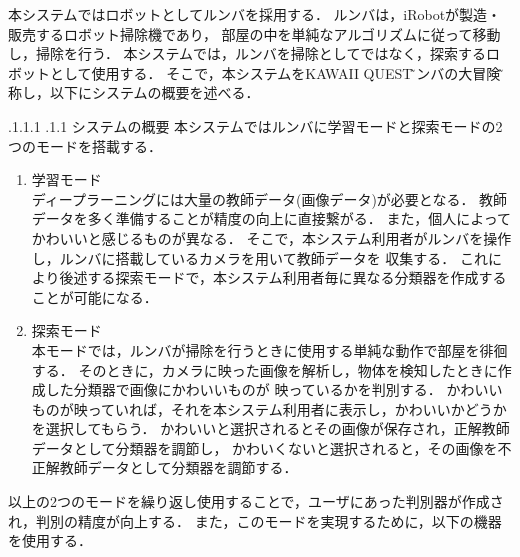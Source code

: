 \documentclass[a4paper, twocolumn]{jarticle}
\makeatletter
\def\subsection{\@startsection{subsection}{1}{\z@}%
 {.1\Cvs \@plus.1\Cdp \@minus.1\Cdp}%
 {.1\Cvs \@plus.1\Cdp}%
 {\normalfont\normalsize\bfseries}}
\makeatother
\begin{document}
本システムではロボットとしてルンバ\cite{roomba}を採用する．
ルンバは，iRobotが製造・販売するロボット掃除機であり，
部屋の中を単純なアルゴリズムに従って移動し，掃除を行う．
本システムでは，ルンバを掃除としてではなく，探索するロボットとして使用する．
そこで，本システムをKAWAII QUEST\~ルンバの大冒険\~と称し，以下にシステムの概要を述べる．

\subsection{システムの概要}
\label{subsec:abstract}
本システムではルンバに学習モードと探索モードの2つのモードを搭載する．
\begin{enumerate}
  \item 学習モード\\ディープラーニングには大量の教師データ(画像データ)が必要となる．
  教師データを多く準備することが精度の向上に直接繋がる．
  また，個人によってかわいいと感じるものが異なる．
  そこで，本システム利用者がルンバを操作し，ルンバに搭載しているカメラを用いて教師データを
  収集する．
  これにより後述する探索モードで，本システム利用者毎に異なる分類器を作成することが可能になる．
  \item 探索モード\\本モードでは，ルンバが掃除を行うときに使用する単純な動作で部屋を徘徊する．
  そのときに，カメラに映った画像を解析し，物体を検知したときに作成した分類器で画像にかわいいものが
  映っているかを判別する．
  かわいいものが映っていれば，それを本システム利用者に表示し，かわいいかどうかを選択してもらう．
  かわいいと選択されるとその画像が保存され，正解教師データとして分類器を調節し，
  かわいくないと選択されると，その画像を不正解教師データとして分類器を調節する．
\end{enumerate}
以上の2つのモードを繰り返し使用することで，ユーザにあった判別器が作成され，判別の精度が向上する．
また，このモードを実現するために，以下の機器を使用する．
\end{document}
